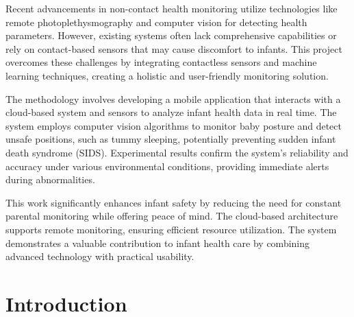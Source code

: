\documentclass[12pt,a4paper]{report}
\begin{document}
Recent advancements in non-contact health monitoring utilize technologies like remote photoplethysmography and computer vision for detecting health parameters. However, existing systems often lack comprehensive capabilities or rely on contact-based sensors that may cause discomfort to infants. This project overcomes these challenges by integrating contactless sensors and machine learning techniques, creating a holistic and user-friendly monitoring solution.

The methodology involves developing a mobile application that interacts with a cloud-based system and sensors to analyze infant health data in real time. The system employs computer vision algorithms to monitor baby posture and detect unsafe positions, such as tummy sleeping, potentially preventing sudden infant death syndrome (SIDS). Experimental results confirm the system's reliability and accuracy under various environmental conditions, providing immediate alerts during abnormalities.

This work significantly enhances infant safety by reducing the need for constant parental monitoring while offering peace of mind. The cloud-based architecture supports remote monitoring, ensuring efficient resource utilization. The system demonstrates a valuable contribution to infant health care by combining advanced technology with practical usability.

\newpage



\renewcommand{\contentsname}{Table of Contents}
\tableofcontents
\listoffigures
{}
\listoftables
{}
\newpage

\pagestyle{fancy}
\fancyhf{}
\renewcommand{\headrulewidth}{0.5pt}
\renewcommand{\footrulewidth}{0.5pt}

\chapter{Introduction}
\par
\end{document}
